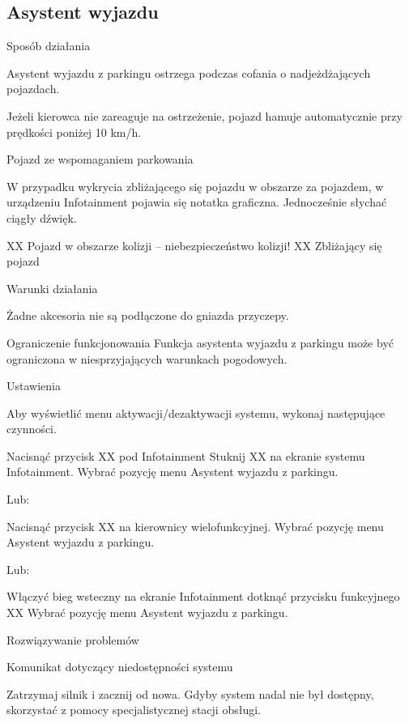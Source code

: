 \subsection{Asystent wyjazdu}

Sposób działania


Asystent wyjazdu z parkingu ostrzega podczas cofania o nadjeżdżających pojazdach.

Jeżeli kierowca nie zareaguje na ostrzeżenie, pojazd hamuje automatycznie przy prędkości poniżej 10 km/h.

Pojazd ze wspomaganiem parkowania

W przypadku wykrycia zbliżającego się pojazdu w obszarze za pojazdem, w urządzeniu Infotainment pojawia się notatka graficzna. Jednocześnie słychać ciągły dźwięk.


XX Pojazd w obszarze kolizji – niebezpieczeństwo kolizji!
XX Zbliżający się pojazd

Warunki działania
\begin{itemizeTick}
	\itemTick Żadne akcesoria nie są podłączone do gniazda przyczepy.
\end{itemizeTick}

Ograniczenie funkcjonowania
Funkcja asystenta wyjazdu z parkingu może być ograniczona w niesprzyjających warunkach pogodowych.

Ustawienia

Aby wyświetlić menu aktywacji/dezaktywacji systemu, wykonaj następujące czynności.
\begin{itemizeArrow}
	\itemArrow Nacisnąć przycisk XX pod Infotainment Stuknij XX na ekranie systemu Infotainment.
	\itemArrow Wybrać pozycję menu Asystent wyjazdu z parkingu.
\end{itemizeArrow}
Lub:
\begin{itemizeArrow}
	\itemArrow Nacisnąć przycisk XX na kierownicy wielofunkcyjnej.
	\itemArrow Wybrać pozycję menu Asystent wyjazdu z parkingu.
\end{itemizeArrow}
Lub:
\begin{itemizeArrow}
	\itemArrow Włączyć bieg wsteczny na ekranie Infotainment dotknąć przycisku funkcyjnego XX
	\itemArrow Wybrać pozycję menu Asystent wyjazdu z parkingu.
\end{itemizeArrow}

Rozwiązywanie problemów

Komunikat dotyczący niedostępności systemu
\begin{itemizeArrow}
	\itemArrow Zatrzymaj silnik i zacznij od nowa.
	\itemArrow Gdyby system nadal nie był dostępny, skorzystać z pomocy specjalistycznej stacji obsługi.
\end{itemizeArrow}

